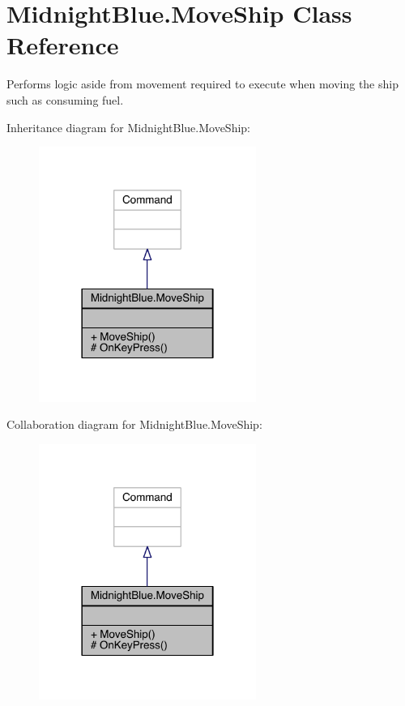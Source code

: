 \hypertarget{class_midnight_blue_1_1_move_ship}{}\section{Midnight\+Blue.\+Move\+Ship Class Reference}
\label{class_midnight_blue_1_1_move_ship}


Performs logic aside from movement required to execute when moving the ship such as consuming fuel.  




Inheritance diagram for Midnight\+Blue.\+Move\+Ship\+:
\nopagebreak
\begin{figure}[H]
\begin{center}
\leavevmode
\includegraphics[width=201pt]{class_midnight_blue_1_1_move_ship__inherit__graph}
\end{center}
\end{figure}


Collaboration diagram for Midnight\+Blue.\+Move\+Ship\+:
\nopagebreak
\begin{figure}[H]
\begin{center}
\leavevmode
\includegraphics[width=201pt]{class_midnight_blue_1_1_move_ship__coll__graph}
\end{center}
\end{figure}
